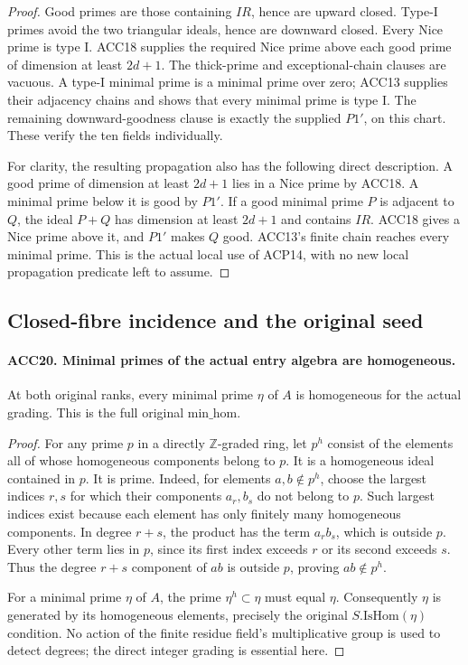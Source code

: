 \documentclass[11pt,a4paper]{article}
\numberwithin{equation}{section}
\theoremstyle{remark}\newtheorem{remark}[theorem]{Remark}
\begin{document}
\begin{proof}
Good primes are those containing \(IR\), hence are upward closed.
Type-I primes avoid the two triangular ideals, hence are downward
closed.  Every Nice prime is type I.  ACC18 supplies the required
Nice prime above each good prime of dimension at least \(2d+1\).
The thick-prime and exceptional-chain clauses are vacuous.  A type-I
minimal prime is a minimal prime over zero; ACC13 supplies their
adjacency chains and shows that every minimal prime is type I.
The remaining downward-goodness clause is exactly the supplied
\(P1'\), on this chart.  These verify the ten fields individually.

For clarity, the resulting propagation also has the following
direct description.  A good prime of dimension at least \(2d+1\)
lies in a Nice prime by ACC18.  A minimal prime below it is good
by \(P1'\).  If a good minimal prime \(P\) is adjacent to
\(Q\), the ideal \(P+Q\) has dimension at least \(2d+1\)
and contains \(IR\).  ACC18 gives a Nice prime above it, and
\(P1'\) makes \(Q\) good.  ACC13's finite chain reaches every
minimal prime.  This is the actual local use of ACP14, with no
new local propagation predicate left to assume.
\end{proof}

\subsection{Closed-fibre incidence and the original seed}

\paragraph{ACC20. Minimal primes of the actual entry algebra are homogeneous.}
\label{claim:ACC20}
At both original ranks, every minimal prime \(\eta\) of \(A\)
is homogeneous for the actual grading.  This is the full original
\(\mathrm{min\_\allowbreak hom}\).

\begin{proof}
For any prime \(p\) in a directly \(\mathbb Z\)-graded ring,
let \(p^h\) consist of the elements all of whose homogeneous
components belong to \(p\).  It is a homogeneous ideal contained
in \(p\).  It is prime.  Indeed, for elements \(a,b\notin p^h\),
choose the largest indices \(r,s\) for which their components
\(a_r,b_s\) do not belong to \(p\).  Such largest indices exist
because each element has only finitely many homogeneous components.
In degree \(r+s\), the product has the term \(a_r b_s\),
which is outside \(p\).  Every other term lies in \(p\), since
its first index exceeds \(r\) or its second exceeds \(s\).
Thus the degree \(r+s\) component of \(ab\) is outside \(p\),
proving \(ab\notin p^h\).

For a minimal prime \(\eta\) of \(A\), the prime
\(\eta^h\subset\eta\) must equal \(\eta\).  Consequently
\(\eta\) is generated by its homogeneous elements, precisely
the original \(S.\mathrm{IsHom}(\eta)\) condition.  No action
of the finite residue field's multiplicative group is used to
detect degrees; the direct integer grading is essential here.
\end{proof}
\end{document}
